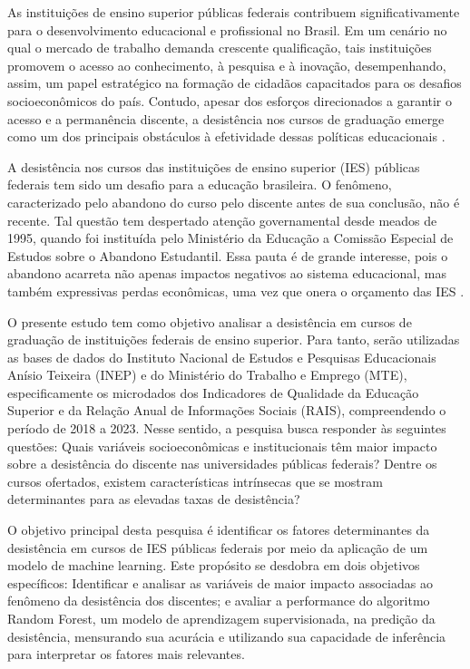 As instituições de ensino superior públicas federais contribuem significativamente para o desenvolvimento educacional e profissional no Brasil. Em um cenário no qual o mercado de trabalho demanda crescente qualificação, tais instituições promovem o acesso ao conhecimento, à pesquisa e à inovação, desempenhando, assim, um papel estratégico na formação de cidadãos capacitados para os desafios socioeconômicos do país. Contudo, apesar dos esforços direcionados a garantir o acesso e a permanência discente, a desistência nos cursos de graduação emerge como um dos principais obstáculos à efetividade dessas políticas educacionais \cite{santos2024previsao}.

A desistência nos cursos das instituições de ensino superior (IES) públicas federais tem sido um desafio para a educação brasileira. O fenômeno, caracterizado pelo abandono do curso pelo discente antes de sua conclusão, não é recente. Tal questão tem despertado atenção governamental desde meados de 1995, quando foi instituída pelo Ministério da Educação a Comissão Especial de Estudos sobre o Abandono Estudantil. Essa pauta é de grande interesse, pois o abandono acarreta não apenas impactos negativos ao sistema educacional, mas também expressivas perdas econômicas, uma vez que onera o orçamento das IES \cite{pinheiro2018}.

O presente estudo tem como objetivo analisar a desistência em cursos de graduação de instituições federais de ensino superior. Para tanto, serão utilizadas as bases de dados do Instituto Nacional de Estudos e Pesquisas Educacionais Anísio Teixeira (INEP) e do Ministério do Trabalho e Emprego (MTE), especificamente os microdados dos Indicadores de Qualidade da Educação Superior e da Relação Anual de Informações Sociais (RAIS), compreendendo o período de 2018 a 2023. Nesse sentido, a pesquisa busca responder às seguintes questões: Quais variáveis socioeconômicas e institucionais têm maior impacto sobre a desistência do discente nas universidades públicas federais? Dentre os cursos ofertados, existem características intrínsecas que se mostram determinantes para as elevadas taxas de desistência?

O objetivo principal desta pesquisa é identificar os fatores determinantes da desistência em cursos de IES públicas federais por meio da aplicação de um modelo de machine learning. Este propósito se desdobra em dois objetivos específicos: Identificar e analisar as variáveis de maior impacto associadas ao fenômeno da desistência dos discentes; e avaliar a performance do algoritmo Random Forest, um modelo de aprendizagem supervisionada, na predição da desistência, mensurando sua acurácia e utilizando sua capacidade de inferência para interpretar os fatores mais relevantes.

